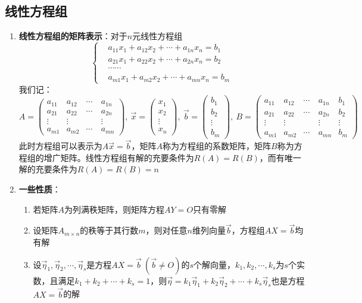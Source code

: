 \documentclass[12pt,a4paper,UTF8]{book}
\begin{document}
\subsection{线性方程组}
\begin{enumerate}
\item \textbf{线性方程组的矩阵表示}：对于$n$元线性方程组
\[\left\{\begin{aligned}
&a_{11}x_1+a_{12}x_2+\cdots+a_{1n}x_n=b_1\\
&a_{21}x_1+a_{22}x_2+\cdots+a_{2n}x_n=b_2\\
&\cdots\cdots\\
&a_{m1}x_1+a_{m2}x_2+\cdots+a_{mn}x_n=b_m
\end{aligned}\right.\]
我们记：
\[A=\begin{pmatrix}a_{11}&a_{12}&\cdots&a_{1n}\\a_{21}&a_{22}&\cdots&a_{2n}\\\vdots&\vdots&\quad&\vdots\\a_{m1}&a_{m2}&\cdots&a_{mn}\end{pmatrix},\ \vec{x}=\begin{pmatrix}x_1\\x_2\\\vdots\\x_n\end{pmatrix},\ \vec{b}=\begin{pmatrix}b_1\\b_2\\\vdots\\b_m\end{pmatrix},\ B=\begin{pmatrix}a_{11}&a_{12}&\cdots&a_{1n}&b_1\\a_{21}&a_{22}&\cdots&a_{2n}&b_2\\\vdots&\vdots&\quad&\vdots&\vdots\\a_{m1}&a_{m2}&\cdots&a_{mn}&b_m\end{pmatrix}\]
此时方程组可以表示为$A\vec{x}=\vec{b}$，矩阵$A$称为方程组的系数矩阵，矩阵$B$称为方程组的增广矩阵。线性方程组有解的充要条件为$R\left(A\right)=R\left(B\right)$，而有唯一解的充要条件为$R\left(A\right)=R\left(B\right)=n$
\item \textbf{一些性质}：
\begin{enumerate}
\item 若矩阵$A$为列满秩矩阵，则矩阵方程$AY=O$只有零解
\item 设矩阵$A_{m\times n}$的秩等于其行数$m$，则对任意$n$维列向量$\vec{b}$，方程组$AX=\vec{b}$均有解
\item 设$\vec{\eta}_1,\vec{\eta}_2,\cdots,\vec{\eta}_s$是方程$AX=\vec{b}\ \left(\vec{b}\neq O\right)$的$s$个解向量，$k_1,k_2,\cdots,k_s$为$s$个实数，且满足$k_1+k_2+\cdots+k_s=1$，则$\vec{\eta}=k_1\vec{\eta}_1+k_2\vec{\eta}_2+\cdots+k_s\vec{\eta}_s$也是方程$AX=\vec{b}$的解

\end{enumerate}
\end{enumerate}
\end{document}
